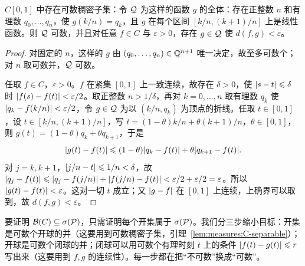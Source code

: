 \begin{lemma}\label{lem:measures:C-separable}
$C[0,1]$ 中存在可数稠密子集：令 $\mathcal{Q}$ 为这样的函数 $g$ 的全体：存在正整数 $n$ 和有理数 $q_0,\dots,q_n$，使 $g(k/n)=q_k$，且 $g$ 在每个区间 $[k/n,(k+1)/n]$ 上是线性函数。则 $\mathcal{Q}$ 可数，并且对任意 $f\in C$ 与 $\varepsilon>0$，存在 $g\in\mathcal{Q}$ 使 $d(f,g)<\varepsilon$。
\end{lemma}
\begin{proof}
对固定的 $n$，这样的 $g$ 由 $(q_0,\dots,q_n)\in\mathbb{Q}^{n+1}$ 唯一决定，故至多可数个；对 $n$ 取可数并，$\mathcal{Q}$ 可数。

任取 $f\in C$，$\varepsilon>0$。$f$ 在紧集 $[0,1]$ 上一致连续，故存在 $\delta>0$，使 $\lvert s-t\rvert\leqslant\delta$ 时 $\lvert f(s)-f(t)\rvert<\varepsilon/2$。取正整数 $n>1/\delta$，再对 $k=0,\dots,n$ 取有理数 $q_k$ 使 $\lvert q_k-f(k/n)\rvert<\varepsilon/2$，令 $g\in\mathcal{Q}$ 为以 $(k/n,q_k)$ 为顶点的折线。任取 $t\in[0,1]$，设 $t\in[k/n,(k+1)/n]$，写 $t=(1-\theta)k/n+\theta(k+1)/n$，$\theta\in[0,1]$，则 $g(t)=(1-\theta)q_k+\theta q_{k+1}$，于是
\[
\lvert g(t)-f(t)\rvert\leqslant(1-\theta)\lvert q_k-f(t)\rvert+\theta\lvert q_{k+1}-f(t)\rvert.
\]
对 $j=k,k+1$，$\lvert j/n-t\rvert\leqslant1/n<\delta$，故 $\lvert q_j-f(t)\rvert\leqslant\lvert q_j-f(j/n)\rvert+\lvert f(j/n)-f(t)\rvert<\varepsilon/2+\varepsilon/2=\varepsilon$。所以 $\lvert g(t)-f(t)\rvert<\varepsilon$。这对一切 $t$ 成立；又 $\lvert g-f\rvert$ 在 $[0,1]$ 上连续，上确界可以取到，故 $d(f,g)<\varepsilon$。
\end{proof}

\begin{remark}[证明思路]
要证明 $\mathcal{B}(C)\subseteq\sigma(\mathcal{P})$，只需证明每个开集属于 $\sigma(\mathcal{P})$。我们分三步缩小目标：开集是可数个开球的并（这要用到可数稠密子集，引理~\ref{lem:measures:C-separable}）；开球是可数个闭球的并；闭球可以用可数个有理时刻 $t$ 上的条件 $\lvert f(t)-g(t)\rvert\leqslant r$ 写出来（这要用到 $f,g$ 的连续性）。每一步都在把“不可数”换成“可数”。
\end{remark}

